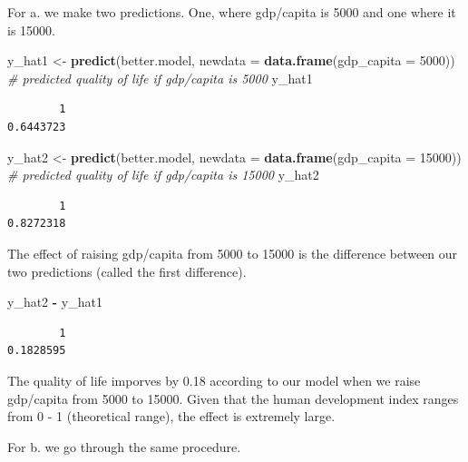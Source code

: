 \documentclass[]{article}
\newenvironment{Shaded}{\begin{snugshade}}{\end{snugshade}}
\newcommand{\KeywordTok}[1]{\textcolor[rgb]{0.13,0.29,0.53}{\textbf{#1}}}
\newcommand{\DataTypeTok}[1]{\textcolor[rgb]{0.13,0.29,0.53}{#1}}
\newcommand{\DecValTok}[1]{\textcolor[rgb]{0.00,0.00,0.81}{#1}}
\newcommand{\StringTok}[1]{\textcolor[rgb]{0.31,0.60,0.02}{#1}}
\newcommand{\CommentTok}[1]{\textcolor[rgb]{0.56,0.35,0.01}{\textit{#1}}}
\newcommand{\OperatorTok}[1]{\textcolor[rgb]{0.81,0.36,0.00}{\textbf{#1}}}
\newcommand{\NormalTok}[1]{#1}
\theoremstyle{definition}
\theoremstyle{definition}
\theoremstyle{definition}
\theoremstyle{remark}
\begin{document}
For a. we make two predictions. One, where gdp/capita is 5000 and one
where it is 15000.

\begin{Shaded}
\begin{Highlighting}[]
\NormalTok{y_hat1 <-}\StringTok{ }\KeywordTok{predict}\NormalTok{(better.model, }\DataTypeTok{newdata =} \KeywordTok{data.frame}\NormalTok{(}\DataTypeTok{gdp_capita =} \DecValTok{5000}\NormalTok{))}
\CommentTok{# predicted quality of life if gdp/capita is 5000}
\NormalTok{y_hat1}
\end{Highlighting}
\end{Shaded}

\begin{verbatim}
        1 
0.6443723 
\end{verbatim}

\begin{Shaded}
\begin{Highlighting}[]
\NormalTok{y_hat2 <-}\StringTok{ }\KeywordTok{predict}\NormalTok{(better.model, }\DataTypeTok{newdata =} \KeywordTok{data.frame}\NormalTok{(}\DataTypeTok{gdp_capita =} \DecValTok{15000}\NormalTok{))}
\CommentTok{# predicted quality of life if gdp/capita is 15000}
\NormalTok{y_hat2}
\end{Highlighting}
\end{Shaded}

\begin{verbatim}
        1 
0.8272318 
\end{verbatim}

The effect of raising gdp/capita from 5000 to 15000 is the difference
between our two predictions (called the first difference).

\begin{Shaded}
\begin{Highlighting}[]
\NormalTok{y_hat2 }\OperatorTok{-}\StringTok{ }\NormalTok{y_hat1}
\end{Highlighting}
\end{Shaded}

\begin{verbatim}
        1 
0.1828595 
\end{verbatim}

The quality of life imporves by 0.18 according to our model when we
raise gdp/capita from 5000 to 15000. Given that the human development
index ranges from 0 - 1 (theoretical range), the effect is extremely
large.

For b. we go through the same procedure.
\end{document}
